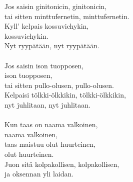 
            Jos saisin ginitonicin, ginitonicin, \\
            tai sitten minttufernetin, minttufernetin. \\
            Kyll' kelpais kossuvichykin, \\
            kossuvichykin. \\
            Nyt ryypätään, nyt ryypätään. \\
\hspace{10mm} \\
            Jos saisin ison tuopposen, \\
            ison tuopposen, \\
            tai sitten pullo-olusen, pullo-olusen. \\
            Kelpaisi tölkki-ölkkikin, tölkki-ölkkikin, \\
            nyt juhlitaan, nyt juhlitaan. \\
\hspace{10mm} \\
            Kun taas on naama valkoinen, \\
            naama valkoinen, \\
            taas maistuu olut huurteinen, \\
            olut huurteinen. \\
            Juon sitä kolpakollisen, kolpakollisen, \\
            ja oksennan yli laidan. \\
\hspace{10mm} \\
